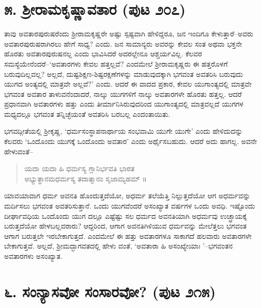\section{೫. ಶ್ರೀರಾಮಕೃಷ್ಣಾವತಾರ (ಪುಟ ೨೦೭)}

ತಾವು ಅವತಾರಪುರುಷರೆಂದು ಶ್ರೀರಾಮಕೃಷ್ಣರೇ ಅಷ್ಟು ಸ್ಪಷ್ಟವಾಗಿ ಹೇಳಿದ್ದರೂ, ಜನ ಇಂದಿಗೂ ಕೇಳುತ್ತಾರೆ–ಅವರು ಅವತಾರಪುರುಷರಾಗಿರಲು ಹೇಗೆ ಸಾಧ್ಯ? ಎಂದು. ಜನ ಸಾಮಾನ್ಯರು ಅವರನ್ನು ಕೇವಲ ಸಂತ ಅಥವಾ ಭಕ್ತನೇ ಹೊರತು ಅವತಾರಪುರುಷನಲ್ಲ ಎಂದು ಭಾವಿಸಿದರೆ ಅದರಲ್ಲೇನೂ ಆಶ್ಚರ್ಯವಿಲ್ಲ. ಕೆಲವರ ಸಮಸ್ಯೆಯೇನೆಂದರೆ–‘ಅವತಾರಗಳು ಕೇವಲ ಹತ್ತಲ್ಲವೆ? ಎಂದಮೇಲೆ ಶ್ರೀರಾಮಕೃಷ್ಣರು ಈ ಹತ್ತರೊಳಗೆ ಬರುವುದಿಲ್ಲವಲ್ಲ? ಅಲ್ಲದೆ, ದುಷ್ಟಶಿಕ್ಷಣ-ಶಿಷ್ಟರಕ್ಷಣೆಗಳನ್ನು ಮಾಡುವುದಕ್ಕಾಗಿ ಭಗವಂತ ಅವತರಿಸಿ ಬರುವುದು ಯುಗದ ಅಂತ್ಯದಲ್ಲಿ ಮಾತ್ರವೇ ಅಲ್ಲವೆ?’ ಎಂದು. ಆದರೆ ಈ ವಾದದ ಪ್ರಕಾರ, ಕೇವಲ ಯುಗಾಂತ್ಯದಲ್ಲಿ ಮಾತ್ರವೇ ಭಗವಂತ ಅವತಾರ ತಾಳುವನೆಂದಾದರೆ, ನಾಲ್ಕು ಯುಗಗಳಿಗೆ ನಾಲ್ಕು ಅವತಾರಗಳೇ ಹೊರತು ಹತ್ತಲ್ಲ. ಆದರೆ ಪ್ರಧಾನವಾಗಿ ಅವತಾರಗಳು ಹತ್ತು ಎಂದು ತೀರ್ಮಾನಿಸಿರುವುದರಿಂದ ಯುಗಾಂತ್ಯದಲ್ಲಿ ಮಾತ್ರವಲ್ಲದೆ ಯುಗಗಳ ಮಧ್ಯದಲ್ಲೂ ಭಗವಂತ ತನ್ನಿಚ್ಛೆಯಂತೆ ಅವತರಿಸಿ ಬರಬಲ್ಲ ಎಂದಂತಾಯಿತು.

ಭಗವದ್ಗೀತೆಯಲ್ಲಿ ಶ್ರೀಕೃಷ್ಣ, ‘ಧರ್ಮಸಂಸ್ಥಾಪನಾರ್ಥಾಯ ಸಂಭವಾಮಿ ಯುಗೇ ಯುಗೇ’ ಎಂದು ಹೇಳಿದುದನ್ನು ಕೆಲವರು ‘ಒಂದೊಂದು ಯುಗಕ್ಕೆ ಒಂದೊಂದು ಅವತಾರ’ ಎಂದು ಅರ್ಥೈಸಬಹುದು. ಆದರೆ ಅದು ಹಾಗಲ್ಲ. ಅವನೇ ಹೇಳುವಂತೆ–

\begin{verse}
ಯದಾ ಯದಾ ಹಿ ಧರ್ಮಸ್ಯ ಗ್ಲಾನಿರ್ಭವತಿ ಭಾರತ\\ಅಭ್ಯುತ್ಥಾನಮಧರ್ಮಸ್ಯ ತದಾತ್ಮಾನಂ ಸೃಜಾಮ್ಯಹಮ್ ॥
\end{verse}

\noindent

ಯಾವಯಾವಾಗ ಧರ್ಮ ಅವನತಿ ಹೊಂದುತ್ತದೆಯೋ, ಅಧರ್ಮ ತಲೆಯೆತ್ತಿ ನಿಲ್ಲುತ್ತದೆಯೋ ಆಗ ಅಧರ್ಮವನ್ನು ಮರ್ದಿಸಲು ಭಗವಂತ ಅವತರಿಸುತ್ತಾನೆ. ಒಂದು ಯುಗವೆಂದರೆ ಅಸಂಖ್ಯಾತ ವರ್ಷಗಳ ಒಂದು ಅವಧಿ. ಇಷ್ಟೊಂದು ದೀರ್ಘಾವಧಿಯ ಒಂದೊಂದು ಯುಗ ದಲ್ಲೂ ಎಷ್ಟೆಷ್ಟು ಸಲ ಧರ್ಮದ ಅವನತಿಯಾಗಿ ಅಧರ್ಮವು ಉಚ್ಛ್ರಾಯಕ್ಕೆ ಬರುತ್ತದೆಯೋ ಹೇಳಬಲ್ಲವರಾರು? ಆದ್ದರಿಂದ, ಆಗಾಗ ಅವನತಿಗಿಳಿಯುವ ಧರ್ಮವನ್ನು ಮೇಲೆತ್ತಲು ಭಗವಂತ ಆಗಾಗ ಬರುತ್ತಲೇ ಇರಬೇಕಾಗುತ್ತದೆ. ಎಂದಮೇಲೆ ಈ ಹತ್ತು ಅವತಾರಗಳೂ ಸಾಕಾಗದೆ ಹಲವಾರು ಅವತಾರಗಳೇ ಬೇಕಾಗುತ್ತವೆ. ಅಲ್ಲದೆ, ಶ್ರೀಮದ್ಭಾಗವತದಲ್ಲಿ ಹೇಳು ವಂತೆ, ‘ಅವತಾರಾ ಹಿ ಅಸಂಖ್ಯೇಯಾಃ ’–ಭಗವಂತನ ಅವತಾರಗಳು ಅಸಂಖ್ಯಾತ.


\section{೬. ಸಂನ್ಯಾಸವೋ ಸಂಸಾರವೋ? (ಪುಟ ೨೧೫)}

